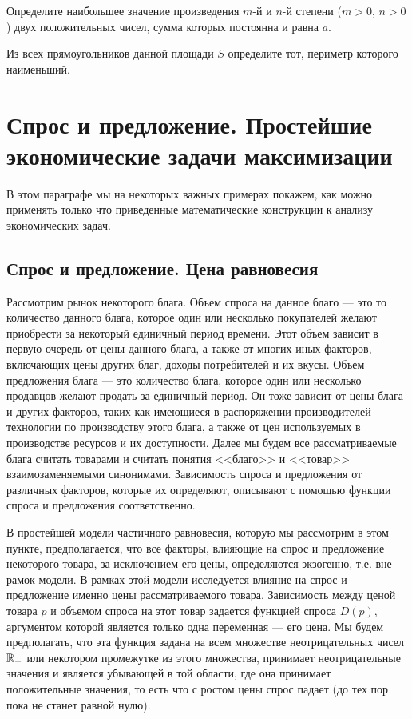 \begin{exer}
    Определите наибольшее значение произведения $m$-й и $n$-й
    степени ($m>0$, $n>0$) двух положительных чисел, сумма которых
    постоянна и равна $a$.
\end{exer}


\begin{exer}
    Из всех прямоугольников данной площади $S$ определите тот,
    периметр которого наименьший.
\end{exer}



\section{Спрос и предложение. Простейшие экономические задачи максимизации}

    В этом параграфе мы на некоторых важных примерах покажем, как
    можно применять только что приведенные математические
    конструкции к анализу экономических задач.

\subsection{Спрос и предложение. Цена равновесия}

    Рассмотрим рынок некоторого блага.
    Объем спроса на данное благо --- это то количество данного блага,
    которое один или несколько покупателей желают приобрести за некоторый единичный период времени.
    Этот объем зависит в первую очередь от цены данного блага, а также
    от многих иных факторов, включающих цены других благ, доходы
    потребителей и их вкусы. Объем предложения блага --- это количество блага,
    которое один или несколько продавцов желают продать за единичный период.
    Он тоже зависит от цены
    блага и других факторов, таких как имеющиеся в распоряжении производителей
    технологии по производству этого блага, а также от цен используемых в
    производстве ресурсов и их доступности. Далее мы будем все рассматриваемые блага
    считать товарами и считать понятия <<благо>> и <<товар>>
    взаимозаменяемыми синонимами. Зависимость спроса и предложения
    от различных факторов, которые их определяют, описывают с
    помощью функции спроса и предложения соответственно.

    В простейшей модели частичного равновесия, которую мы рассмотрим
    в этом пункте, предполагается,
    что все факторы, влияющие на спрос и предложение некоторого
    товара, за исключением его цены,  определяются экзогенно, т.е.
    вне рамок модели. В
    рамках этой модели исследуется  влияние  на спрос и предложение
    именно цены рассматриваемого товара.
    Зависимость между ценой товара $p$ и объемом спроса на этот товар
    задается функцией спроса $D(p)$, аргументом которой является
    только одна переменная --- его цена.
        Мы будем предполагать, что эта функция задана на всем множестве
    неотрицательных чисел $\mathbb{R}_{+}$ или некотором промежутке из этого множества,
    принимает неотрицательные значения и
    является убывающей в той области, где она принимает положительные значения,
    то есть что с ростом цены спрос падает (до тех пор пока не станет равной нулю).

